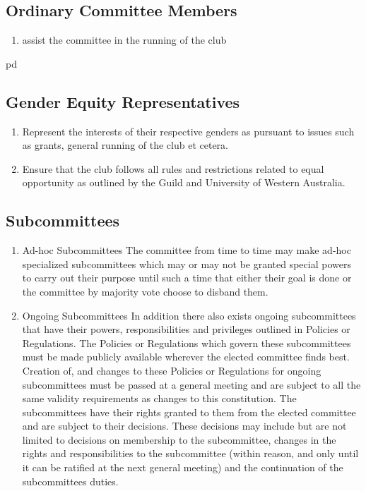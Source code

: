 \documentclass[10pt,a4paper]{report}
\begin{document}
		\subsection{Ordinary Committee Members}
			\begin{enumerate}[label=\alph*]
				\item assist the committee in the running of the club
			\end{enumerate}
pd
		\subsection{Gender Equity Representatives}
			\begin{enumerate}[label=\alph*]
				\item Represent the interests of their respective genders as pursuant to issues such as grants, general running of the club et cetera.
				\item Ensure that the club follows all rules and restrictions related to equal opportunity as outlined by the Guild and University of Western Australia.
			\end{enumerate}
		
		\subsection{Subcommittees}
			\begin{enumerate}[label=\arabic*]
			\item Ad-hoc Subcommittees
				The committee from time to time may make ad-hoc specialized subcommittees which may or may not be granted special powers to carry out their purpose until such a time that either their goal is done or the committee by majority vote choose to disband them.
			\item Ongoing Subcommittees 
				In addition there also exists ongoing subcommittees that have their powers, responsibilities and privileges outlined in Policies or Regulations.
				The Policies or Regulations which govern these subcommittees must be made publicly available wherever the elected committee finds best.
				Creation of, and changes to these Policies or Regulations for ongoing subcommittees must be passed at a general meeting and are subject to all the same validity requirements as changes to this constitution.
				The subcommittees have their rights granted to them from the elected committee and are subject to their decisions. These decisions may include but are not limited to decisions on membership to the subcommittee, changes in the rights and responsibilities to the subcommittee (within reason, and only until it can be ratified at the next general meeting) and the continuation of the subcommittees duties.
				\end{enumerate}
\end{document}
